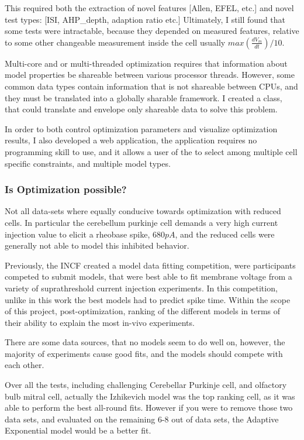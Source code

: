 This required both the extraction of novel features [Allen, EFEL, etc.] and novel test types: [ISI, AHP\_depth, adaption ratio etc.] Ultimately, I still found that some tests were intractable, because they depended on measured features, relative to some other changeable measurement inside the cell usually $max(\frac{dV_{m}}{dt})/10.$

Multi-core and or multi-threaded optimization requires that information about model properties be shareable between various processor threads. However, some common data types contain information that is not shareable between CPUs, and they must be translated into a globally sharable framework. I created a class, that could translate and envelope only shareable data to solve this problem.

In order to both control optimization parameters and visualize optimization results, I also developed a web application, the application requires no programming skill to use, and it allows a user of the to select among multiple cell specific constraints, and multiple model types. 
%


\subsubsection{Is Optimization possible?}
Not all data-sets where equally conducive towards optimization with reduced cells. In particular the cerebellum purkinje cell demands a very high current injection value to elicit a rheobase spike, $680pA$, and the reduced cells were generally not able to model this inhibited behavior.

Previously, the INCF created a model data fitting competition, were participants competed to submit models, that were best able to fit membrane voltage from a variety of suprathreshold current injection experiments. In this competition, unlike in this work the best models had to predict spike time. Within the scope of this project, post-optimization, ranking of the different models in terms of their ability to explain the most in-vivo experiments. 

There are some data sources, that no models seem to do well on, however, the majority of experiments cause good fits, and the models should compete with each other.

Over all the tests, including challenging Cerebellar Purkinje cell, and olfactory bulb mitral cell, actually the Izhikevich model was the top ranking cell, as it was able to perform the best all-round fits. However if you were to remove those two data sets, and evaluated on the remaining 6-8 out of data sets, the Adaptive Exponential model would be a better fit.


